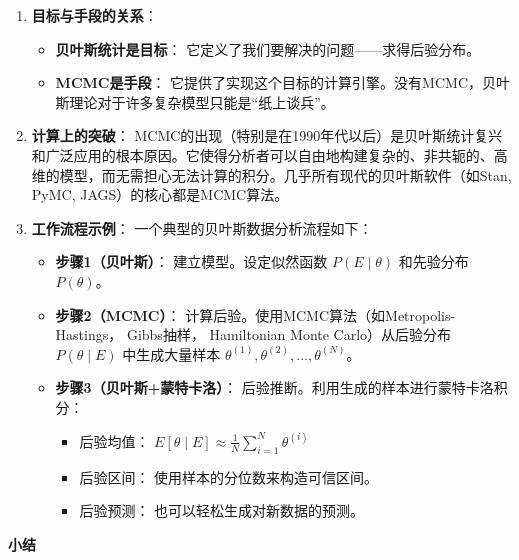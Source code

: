 \documentclass[
  twoside]{book}
\providecommand{\tightlist}{%
  \setlength{\itemsep}{0pt}\setlength{\parskip}{0pt}}
\begin{document}
\begin{enumerate}
\def\labelenumi{\arabic{enumi}.}
\item
  \textbf{目标与手段的关系}：

  \begin{itemize}
  \tightlist
  \item
    \textbf{贝叶斯统计是目标}： 它定义了我们要解决的问题------求得后验分布。
  \item
    \textbf{MCMC是手段}： 它提供了实现这个目标的计算引擎。没有MCMC，贝叶斯理论对于许多复杂模型只能是``纸上谈兵''。
  \end{itemize}
\item
  \textbf{计算上的突破}：
  MCMC的出现（特别是在1990年代以后）是贝叶斯统计复兴和广泛应用的根本原因。它使得分析者可以自由地构建复杂的、非共轭的、高维的模型，而无需担心无法计算的积分。几乎所有现代的贝叶斯软件（如Stan, PyMC, JAGS）的核心都是MCMC算法。
\item
  \textbf{工作流程示例}：
  一个典型的贝叶斯数据分析流程如下：

  \begin{itemize}
  \tightlist
  \item
    \textbf{步骤1（贝叶斯）}： 建立模型。设定似然函数 \(P(E \mid \theta)\) 和先验分布 \(P(\theta)\)。
  \item
    \textbf{步骤2（MCMC）}： 计算后验。使用MCMC算法（如Metropolis-Hastings， Gibbs抽样， Hamiltonian Monte Carlo）从后验分布 \(P(\theta \mid E)\) 中生成大量样本 \(\theta^{(1)}, \theta^{(2)}, ..., \theta^{(N)}\)。
  \item
    \textbf{步骤3（贝叶斯+蒙特卡洛）}： 后验推断。利用生成的样本进行蒙特卡洛积分：

    \begin{itemize}
    \tightlist
    \item
      后验均值： \(E[\theta \mid E] \approx \frac{1}{N} \sum_{i=1}^N \theta^{(i)}\)
    \item
      后验区间： 使用样本的分位数来构造可信区间。
    \item
      后验预测： 也可以轻松生成对新数据的预测。
    \end{itemize}
  \end{itemize}
\end{enumerate}

\textbf{小结}
\end{document}
